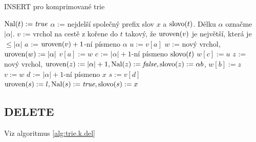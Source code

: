 \begin{algorithm}
\caption{INSERT pro komprimované trie}
\label{alg:trie.k.ins}
\begin{algorithmic}
\STATE {}
	\STATE {}
\ELSE
		\STATE {}
                \STATE $\textrm{Nal}(t) := \textit{true}$
	\ELSE
		\STATE {}
		\STATE {}
                \STATE $\alpha$ := nejdelší společný prefix slov
		$x$ a $\textrm{slovo}(t)$. Délku $\alpha$ označme $|\alpha|$.
                \STATE $v$ := vrchol na cestě z kořene do $t$ takový,
                že $\textrm{uroven}(v)$ je největší, která je $\leq |\alpha|$
                        \STATE {}
                        \STATE {}
                        \STATE $a$ := $\textrm{uroven}(v)+1$-ní písmeno $\alpha$
                        \STATE $u := v[a]$
                        \STATE {}
                        \STATE $w$ := nový vrchol, $\textrm{uroven}(w) := |\alpha|$
                        \STATE $v[a] := w$
                        \STATE $c$ := $|\alpha|+1$-ní písmeno $\textrm{slovo}(t)$
                        \STATE $w[c] := u$
                             \STATE $z$ := nový vrchol, $\textrm{uroven}(z) := |\alpha|+1, \textrm{Nal}(z) := \textit{false}, \textrm{slovo}(z) := \alpha b$, 
                             \STATE $w[b] := z$
                        \ENDFOR
                        \STATE $v := w$
                \ENDIF
		\STATE {}
		\STATE $d$ := $|\alpha|+1$-ní písmeno $x$
                \STATE $s := v[d]$
                \STATE $\textrm{uroven}(s) := l, \textrm{Nal}(s) := \textit{true}, \textrm{slovo}(s) := x$
        \ENDIF
\ENDIF
\end{algorithmic}
\end{algorithm}

\subsection{DELETE}

Viz algoritmus \ref{alg:trie.k.del}

